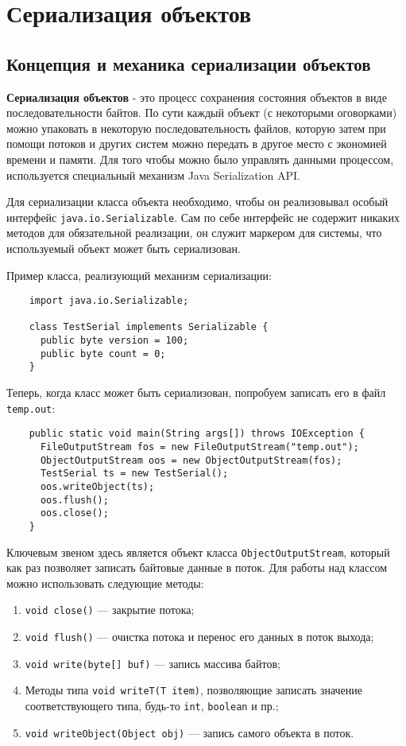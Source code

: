 \newpage
\chapter{Сериализация объектов}

\section{Концепция и механика сериализации объектов}

\textbf{Сериализация объектов} - это процесс сохранения состояния объектов в виде последовательности байтов. По сути каждый объект (с некоторыми оговорками) можно упаковать в некоторую последовательность файлов, которую затем при помощи потоков и других систем можно передать в другое место с экономией времени и памяти. Для того чтобы можно было управлять данными процессом, используется специальный механизм Java Serialization API.

Для сериализации класса объекта необходимо, чтобы он реализовывал особый интерфейс \verb|java.io.Serializable|. Сам по себе интерфейс не содержит никаких методов для обязательной реализации, он служит маркером для системы, что используемый объект может быть сериализован.

Пример класса, реализующий механизм сериализации:

\begin{lstlisting}
    import java.io.Serializable;
    
    class TestSerial implements Serializable {
      public byte version = 100;
      public byte count = 0;
    }
\end{lstlisting}

Теперь, когда класс может быть сериализован, попробуем записать его в файл \verb|temp.out|:

\begin{lstlisting}
    public static void main(String args[]) throws IOException {
      FileOutputStream fos = new FileOutputStream("temp.out");
      ObjectOutputStream oos = new ObjectOutputStream(fos);
      TestSerial ts = new TestSerial();
      oos.writeObject(ts);
      oos.flush();
      oos.close();
    }
\end{lstlisting}

Ключевым звеном здесь является объект класса \verb|ObjectOutputStream|, который как раз позволяет записать байтовые данные в поток. Для работы над классом можно использовать следующие методы:

\begin{enumerate}
    \item \verb|void close()| — закрытие потока;
    \item \verb|void flush()| — очистка потока и перенос его данных в поток выхода;
    \item \verb|void write(byte[] buf)| — запись массива байтов;
    \item Методы типа \verb|void writeT(T item)|, позволяющие записать значение соответствующего типа, будь-то \verb|int|, \verb|boolean| и пр.;
    \item \verb|void writeObject(Object obj)| — запись самого объекта в поток.
\end{enumerate}

